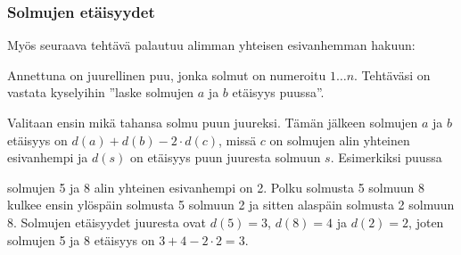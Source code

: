 \subsubsection{Solmujen etäisyydet}

Myös seuraava tehtävä palautuu alimman yhteisen
esivanhemman hakuun:
\begin{task}
Annettuna on juurellinen puu, jonka solmut on numeroitu $1 \ldots n$.
Tehtäväsi on vastata kyselyihin
''laske solmujen $a$ ja $b$ etäisyys puussa''.
\end{task}

Valitaan ensin mikä tahansa
solmu puun juureksi.
Tämän jälkeen solmujen $a$ ja $b$
etäisyys on $d(a)+d(b)-2 \cdot d(c)$,
missä $c$ on solmujen alin yhteinen esivanhempi
ja $d(s)$ on etäisyys puun juuresta solmuun $s$.
Esimerkiksi puussa

\begin{center}
\end{center}

solmujen 5 ja 8 alin yhteinen esivanhempi on 2.
Polku solmusta 5 solmuun 8
kulkee ensin ylöspäin solmusta 5
solmuun 2 ja sitten alaspäin
solmusta 2 solmuun 8.
Solmujen etäisyydet juuresta ovat $d(5)=3$,
$d(8)=4$ ja $d(2)=2$,
joten solmujen 5 ja 8 etäisyys
on $3+4-2\cdot2=3$.
